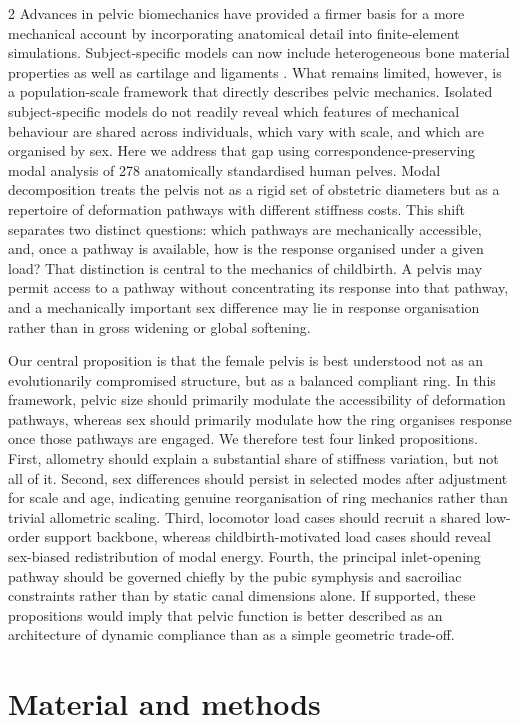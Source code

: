 \documentclass[openacc]{rsproca_new}
\begin{document}
\begin{multicols}{2}
Advances in pelvic biomechanics have provided a firmer basis for a more mechanical account by incorporating anatomical detail into finite-element simulations. Subject-specific models can now include heterogeneous bone material properties as well as cartilage and ligaments \cite{Eichenseer2011,Hammer2013}. What remains limited, however, is a population-scale framework that directly describes pelvic mechanics. Isolated subject-specific models do not readily reveal which features of mechanical behaviour are shared across individuals, which vary with scale, and which are organised by sex. Here we address that gap using correspondence-preserving modal analysis of 278 anatomically standardised human pelves. Modal decomposition treats the pelvis not as a rigid set of obstetric diameters but as a repertoire of deformation pathways with different stiffness costs. This shift separates two distinct questions: which pathways are mechanically accessible, and, once a pathway is available, how is the response organised under a given load? That distinction is central to the mechanics of childbirth. A pelvis may permit access to a pathway without concentrating its response into that pathway, and a mechanically important sex difference may lie in response organisation rather than in gross widening or global softening.

Our central proposition is that the female pelvis is best understood not as an evolutionarily compromised structure, but as a balanced compliant ring. In this framework, pelvic size should primarily modulate the accessibility of deformation pathways, whereas sex should primarily modulate how the ring organises response once those pathways are engaged. We therefore test four linked propositions. First, allometry should explain a substantial share of stiffness variation, but not all of it. Second, sex differences should persist in selected modes after adjustment for scale and age, indicating genuine reorganisation of ring mechanics rather than trivial allometric scaling. Third, locomotor load cases should recruit a shared low-order support backbone, whereas childbirth-motivated load cases should reveal sex-biased redistribution of modal energy. Fourth, the principal inlet-opening pathway should be governed chiefly by the pubic symphysis and sacroiliac constraints rather than by static canal dimensions alone. If supported, these propositions would imply that pelvic function is better described as an architecture of dynamic compliance than as a simple geometric trade-off.

\section{Material and methods}


\end{multicols}
\end{document}

